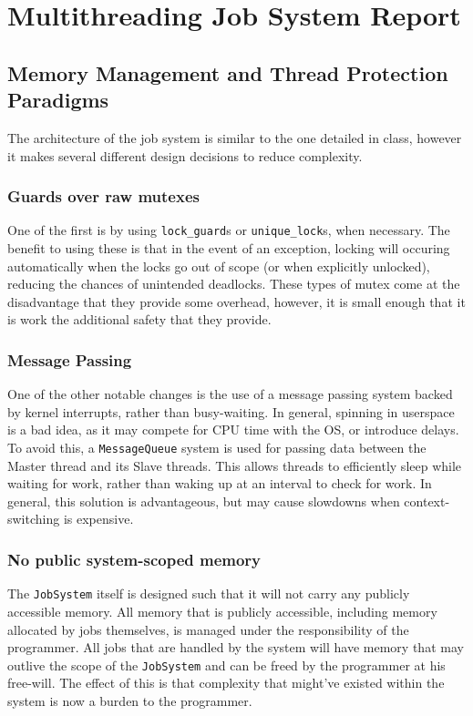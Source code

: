 \documentclass{article}
\begin{document}
\section*{Multithreading Job System Report}
	\subsection{Memory Management and Thread Protection Paradigms}
	The architecture of the job system is similar to the one detailed in class, however it makes several different design decisions to reduce complexity.
		\subsubsection{Guards over raw mutexes}
		One of the first is by using \texttt{lock\_guard}s or \texttt{unique\_lock}s, when necessary. The benefit to using these is that in the event of an exception, locking will occuring automatically when the locks go out of scope (or when explicitly unlocked), reducing the chances of unintended deadlocks. These types of mutex come at the disadvantage that they provide some overhead, however, it is small enough that it is work the additional safety that they provide.
		\subsubsection{Message Passing}
			One of the other notable changes is the use of a message passing system backed by kernel interrupts, rather than busy-waiting. In general, spinning in userspace is a bad idea, as it may compete for CPU time with the OS, or introduce delays. To avoid this, a \texttt{MessageQueue} system is used for passing data between the Master thread and its Slave threads. This allows threads to efficiently sleep while waiting for work, rather than waking up at an interval to check for work. In general, this solution is advantageous, but may cause slowdowns when context-switching is expensive.
		\subsubsection{No public system-scoped memory}
			The \texttt{JobSystem} itself is designed such that it will not carry any publicly accessible memory. All memory that is publicly accessible, including memory allocated by jobs themselves, is managed under the responsibility of the programmer. All jobs that are handled by the system will have memory that may outlive the scope of the \texttt{JobSystem} and can be freed by the programmer at his free-will. The effect of this is that complexity that might've existed within the system is now a burden to the programmer.
\end{document}
